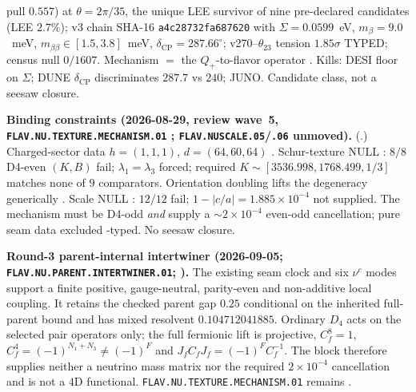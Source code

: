 \documentclass[11pt,a4paper]{article}
\theoremstyle{definition}
\begin{document}
pull $0.557$) at $\theta=2\pi/35$, the unique LEE survivor of nine pre-declared candidates
(LEE $2.7\%$); v3 chain SHA-16 \texttt{a4c28732fa687620} with $\Sigma=0.0599$~eV,
$m_\beta=9.0$~meV, $m_{\beta\beta}\in[1.5,3.8]$~meV, $\delta_{\mathrm{CP}}=287.66^\circ$;
v270--$\theta_{23}$ tension $1.85\sigma$ TYPED; census null $0/1607$.
Mechanism $=$ the $Q_+$-to-flavor operator \mO.
Kills: DESI floor on $\Sigma$; DUNE $\delta_{\mathrm{CP}}$ discriminates $287.7$ vs $240$;
JUNO.  Candidate class, not a seesaw closure.
\par\smallskip\noindent\textbf{Binding constraints (2026-08-29, review wave~5,
\texttt{FLAV.NU.TEXTURE.MECHANISM.01} \mO; \texttt{FLAV.NUSCALE.05}/\texttt{.06} unmoved).}
(.)
Charged-sector data $h=(1,1,1)$, $d=(64,60,64)$ \mE.  Schur-texture NULL \mX: $8/8$ D4-even
$(K,B)$ fail; $\lambda_1=\lambda_3$ forced; required $K\sim[3536.998,1768.499,1/3]$ matches none
of $9$ comparators.  Orientation doubling lifts the degeneracy generically \mE.  Scale NULL
\mX: $12/12$ fail; $1-\lvert c/a\rvert=1.885{\times}10^{-4}$ not supplied.  The mechanism must
be D4-odd \emph{and} supply a $\sim2{\times}10^{-4}$ even-odd cancellation; pure seam data
excluded \mX-typed.  No seesaw closure.
\par\smallskip\noindent\textbf{Round-3 parent-internal intertwiner
(2026-09-05; \texttt{FLAV.NU.PARENT.INTERTWINER.01};
).}
The existing seam clock and six $\nu^c$ modes support a finite positive,
gauge-neutral, parity-even and non-additive local coupling.  It retains the
checked parent gap $0.25$ conditional on the inherited full-parent bound and has
mixed resolvent $0.104712041885$.  Ordinary $D_4$ acts on the selected pair
operators only; the full fermionic lift is projective,
$C_f^8=1$, $C_f^4=(-1)^{N_1+N_3}\ne(-1)^F$ and
$J_fC_fJ_f=(-1)^F C_f^{-1}$.  The block therefore supplies neither a neutrino
mass matrix nor the required $2{\times}10^{-4}$ cancellation and is not a
$4$D functional.  \texttt{FLAV.NU.TEXTURE.MECHANISM.01} remains \mO.

\end{document}

